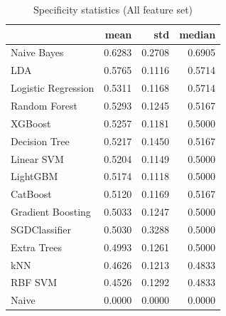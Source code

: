 \begin{table}
\caption{Specificity statistics (All feature set)}
\label{tab:specificity_All_stats}
\begin{tabular}{lrrr}
\toprule
 & mean & std & median \\
\midrule
Naive Bayes & 0.6283 & 0.2708 & 0.6905 \\
LDA & 0.5765 & 0.1116 & 0.5714 \\
Logistic Regression & 0.5311 & 0.1168 & 0.5714 \\
Random Forest & 0.5293 & 0.1245 & 0.5167 \\
XGBoost & 0.5257 & 0.1181 & 0.5000 \\
Decision Tree & 0.5217 & 0.1450 & 0.5167 \\
Linear SVM & 0.5204 & 0.1149 & 0.5000 \\
LightGBM & 0.5174 & 0.1118 & 0.5000 \\
CatBoost & 0.5120 & 0.1169 & 0.5167 \\
Gradient Boosting & 0.5033 & 0.1247 & 0.5000 \\
SGDClassifier & 0.5030 & 0.3288 & 0.5000 \\
Extra Trees & 0.4993 & 0.1261 & 0.5000 \\
kNN & 0.4626 & 0.1213 & 0.4833 \\
RBF SVM & 0.4526 & 0.1292 & 0.4833 \\
Naive & 0.0000 & 0.0000 & 0.0000 \\
\bottomrule
\end{tabular}
\end{table}
